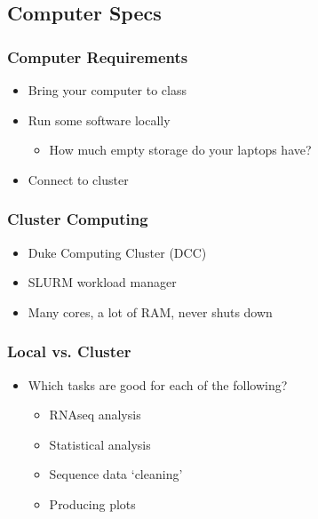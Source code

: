 \documentclass[14pt]{beamer}
\begin{document}
\subsection{Computer Specs}

\begin{frame}
\frametitle{Computer Requirements}
\begin{itemize}
	\item Bring your computer to class
	\item Run some software locally
	\begin{itemize}
		\item How much empty storage do your laptops have?
	\end{itemize}
	\item Connect to cluster
\end{itemize}
\end{frame}

\begin{frame}
\frametitle{Cluster Computing}
\begin{itemize}
	\item Duke Computing Cluster (DCC)
	\item SLURM workload manager
	\item Many cores, a lot of RAM, never shuts down
\end{itemize}
\end{frame}

\begin{frame}
\frametitle{Local vs. Cluster}
\begin{itemize}
	\item Which tasks are good for each of the following?
	\begin{itemize}
	\item<+-> RNAseq analysis 
	\item<+-> Statistical analysis 
	\item<+-> Sequence data `cleaning' 
	\item<+-> Producing plots 
	\end{itemize}
\end{itemize}
\end{frame}

\end{document}
